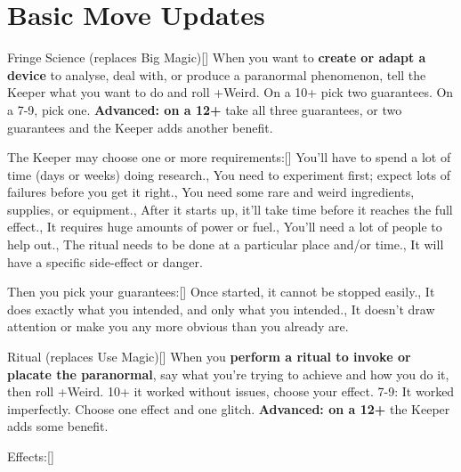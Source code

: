 \documentclass[10pt,oneside,landscape]{memoir}
\begin{document}
\chapter*{Basic Move Updates}
\setlength\columnsep{12mm}
\begin{multicols}{3}
\begin{minipage}[t][0.75\textheight][t]{1\linewidth}
\begin{pbsect}{Fringe Science (replaces Big Magic)}[]
When you want to \textbf{create or adapt a device} to analyse, deal with, or produce a paranormal phenomenon, tell the Keeper what you want to do and roll +Weird.  On a 10+ pick two guarantees.  On a 7-9, pick one.
\br[2mm]
%
\textbf{Advanced: on a 12+} take all three guarantees, or two guarantees and the Keeper adds another benefit.
\end{pbsect}%
\br[4mm]
%
\begin{blurb*}{The Keeper may choose one or more requirements:}[]%
\holdoptions%
    {{You’ll have to spend a lot of time (days or weeks) doing research.},
    {You need to experiment first; expect lots of failures before you get it right.},
    {You need some rare and weird ingredients, supplies, or equipment.},
    {After it starts up, it’ll take time before it reaches the full effect.},
    {It requires huge amounts of power or fuel.},
    {You'll need a lot of people to help out.},
    {The ritual needs to be done at a particular place and/or time.},
    {It will have a specific side-effect or danger.}}
\end{blurb*}%
\br[1mm]
%
\begin{blurb*}{Then you pick your guarantees:}[]%
\holdoptions%
    {{Once started, it cannot be stopped easily.},
    {It does exactly what you intended, and only what you intended.},
    {It doesn’t draw attention or make you any more obvious than you already are.}}
\end{blurb*}
\end{minipage}
%
\begin{minipage}[t][0.75\textheight][t]{1\linewidth}
\begin{pbsect}{Ritual (replaces Use Magic)}[]
When you \textbf{perform a ritual to invoke or placate the paranormal}, say what you’re trying to achieve and how you do it, then roll +Weird.  10+ it worked without issues, choose your effect.  7-9: It worked imperfectly.  Choose one effect and one glitch.
\br[2mm]
%
\textbf{Advanced: on a 12+} the Keeper adds some benefit.
\end{pbsect}
\br[2mm]
%
\begin{blurb*}{Effects:}[]%

\end{blurb*}
\end{minipage}
\end{multicols}
\end{document}
